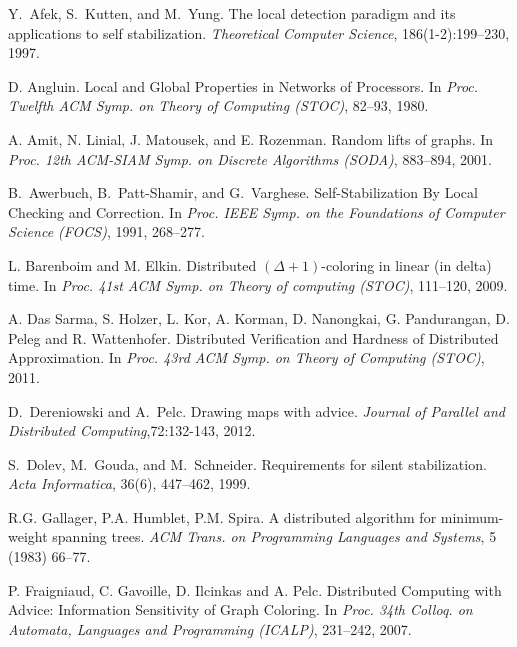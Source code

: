 \documentclass{llncs}
\begin{document}
\begin{thebibliography}{99}

Y.~Afek, S.~Kutten, and M.~Yung.
\newblock The local detection paradigm and its applications to self
  stabilization.
\newblock \emph{Theoretical Computer Science}, 186(1-2):199--230, 1997.

D. Angluin.
\newblock Local and Global Properties in Networks of Processors.
\newblock In \emph{Proc. Twelfth ACM Symp. on Theory of Computing (STOC)}, 
82--93, 1980. 

A. Amit, N. Linial, J. Matousek, and E. Rozenman.
\newblock Random lifts of graphs.
\newblock  In \emph{Proc. 12th ACM-SIAM Symp. on Discrete Algorithms (SODA)},  883--894, 2001.

B.~Awerbuch, B.~Patt-Shamir, and G.~Varghese.
\newblock Self-Stabilization By Local Checking and Correction.
\newblock In \emph{ Proc. IEEE Symp. on the Foundations of Computer
Science (FOCS)}, 1991, 268--277.

L. Barenboim and M. Elkin.
\newblock Distributed $(\Delta+1)$-coloring in linear (in delta) time.
\newblock In \emph{Proc. 41st ACM Symp. on Theory of computing (STOC)}, 111--120,
2009.

A. Das Sarma, S. Holzer,  L. Kor, A.  Korman, D. Nanongkai, G. Pandurangan,
D. Peleg and R. Wattenhofer.
\newblock Distributed Verification and Hardness of Distributed Approximation.
\newblock In \emph{Proc. 43rd ACM Symp. on Theory of Computing (STOC)}, 2011.

D.~Dereniowski and A.~Pelc.
\newblock Drawing maps with advice.
\newblock \emph{Journal of Parallel and Distributed Computing},72:132-143, 2012.

S.~Dolev, M.~Gouda, and M.~Schneider.
\newblock Requirements for silent stabilization.
\newblock \emph{Acta Informatica}, 36(6), 447--462, 1999.


R.G. Gallager, P.A. Humblet, P.M. Spira.
\newblock A distributed algorithm for minimum-weight
spanning trees.
\newblock \emph{ACM Trans. on Programming Languages and Systems}, 5 (1983) 66--77.

P. Fraigniaud, C. Gavoille, D. Ilcinkas and A. Pelc.
\newblock Distributed Computing with Advice: Information Sensitivity
of Graph Coloring.
\newblock  In \emph{Proc. 34th Colloq. on Automata, Languages and
Programming (ICALP)}, 231--242, 2007.


\end{thebibliography}
\end{document}
